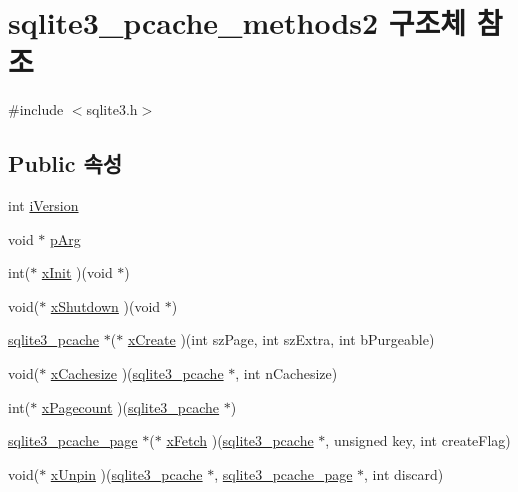 \hypertarget{structsqlite3__pcache__methods2}{}\section{sqlite3\+\_\+pcache\+\_\+methods2 구조체 참조}
\label{structsqlite3__pcache__methods2}


{\ttfamily \#include $<$sqlite3.\+h$>$}

\subsection*{Public 속성}
\begin{DoxyCompactItemize}
\item 
int \hyperlink{structsqlite3__pcache__methods2_a03b27be6c7cb8f1d2662c454cbe58483}{i\+Version}
\item 
void $\ast$ \hyperlink{structsqlite3__pcache__methods2_aee83131f16bb88218d7b0339854719d6}{p\+Arg}
\item 
int($\ast$ \hyperlink{structsqlite3__pcache__methods2_a21f7fdd82d029d3b0567c573c012adfc}{x\+Init} )(void $\ast$)
\item 
void($\ast$ \hyperlink{structsqlite3__pcache__methods2_a4285fc03adf01cbd3283644a1072ffef}{x\+Shutdown} )(void $\ast$)
\item 
\hyperlink{sqlite3_8h_a096c453d937d51f7926d7d31c8e0bd2f}{sqlite3\+\_\+pcache} $\ast$($\ast$ \hyperlink{structsqlite3__pcache__methods2_aa8babc280d7ba89c6c279301d5a36d69}{x\+Create} )(int sz\+Page, int sz\+Extra, int b\+Purgeable)
\item 
void($\ast$ \hyperlink{structsqlite3__pcache__methods2_a76de689adc20fdbfef427b1c7ae1bcea}{x\+Cachesize} )(\hyperlink{sqlite3_8h_a096c453d937d51f7926d7d31c8e0bd2f}{sqlite3\+\_\+pcache} $\ast$, int n\+Cachesize)
\item 
int($\ast$ \hyperlink{structsqlite3__pcache__methods2_a16b85f7889b050702c739eccf2f0c036}{x\+Pagecount} )(\hyperlink{sqlite3_8h_a096c453d937d51f7926d7d31c8e0bd2f}{sqlite3\+\_\+pcache} $\ast$)
\item 
\hyperlink{structsqlite3__pcache__page}{sqlite3\+\_\+pcache\+\_\+page} $\ast$($\ast$ \hyperlink{structsqlite3__pcache__methods2_a6283d91a6ad5037fad33003c2198c9f7}{x\+Fetch} )(\hyperlink{sqlite3_8h_a096c453d937d51f7926d7d31c8e0bd2f}{sqlite3\+\_\+pcache} $\ast$, unsigned key, int create\+Flag)
\item 
void($\ast$ \hyperlink{structsqlite3__pcache__methods2_a8fcb4ba48106aac8dfff247baea06e1a}{x\+Unpin} )(\hyperlink{sqlite3_8h_a096c453d937d51f7926d7d31c8e0bd2f}{sqlite3\+\_\+pcache} $\ast$, \hyperlink{structsqlite3__pcache__page}{sqlite3\+\_\+pcache\+\_\+page} $\ast$, int discard)

\end{DoxyCompactItemize}
